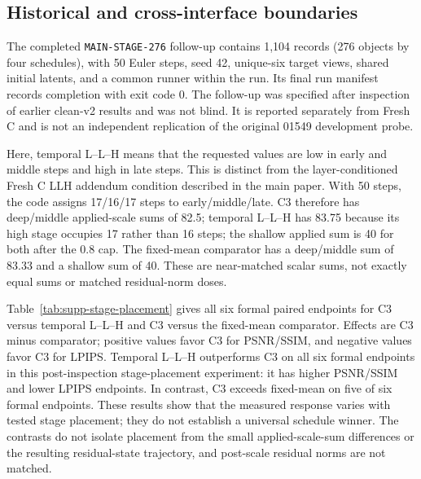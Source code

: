\documentclass[11pt]{article}
\begin{document}
\clearpage

\subsection*{Historical and cross-interface boundaries}
The completed \texttt{MAIN-STAGE-276} follow-up contains 1,104 records (276 objects by four schedules), with 50 Euler steps, seed 42, unique-six target views, shared initial latents, and a common runner within the run. Its final run manifest records completion with exit code 0. The follow-up was specified after inspection of earlier clean-v2 results and was not blind. It is reported separately from Fresh C and is not an independent replication of the original 01549 development probe.

Here, temporal L--L--H means that the requested values are low in early and middle steps and high in late steps. This is distinct from the layer-conditioned Fresh C LLH addendum condition described in the main paper. With 50 steps, the code assigns 17/16/17 steps to early/middle/late. C3 therefore has deep/middle applied-scale sums of 82.5; temporal L--L--H has 83.75 because its high stage occupies 17 rather than 16 steps; the shallow applied sum is 40 for both after the 0.8 cap. The fixed-mean comparator has a deep/middle sum of 83.33 and a shallow sum of 40. These are near-matched scalar sums, not exactly equal sums or matched residual-norm doses.

Table~\ref{tab:supp-stage-placement} gives all six formal paired endpoints for C3 versus temporal L--L--H and C3 versus the fixed-mean comparator. Effects are C3 minus comparator; positive values favor C3 for PSNR/SSIM, and negative values favor C3 for LPIPS. Temporal L--L--H outperforms C3 on all six formal endpoints in this post-inspection stage-placement experiment: it has higher PSNR/SSIM and lower LPIPS endpoints. In contrast, C3 exceeds fixed-mean on five of six formal endpoints. These results show that the measured response varies with tested stage placement; they do not establish a universal schedule winner. The contrasts do not isolate placement from the small applied-scale-sum differences or the resulting residual-state trajectory, and post-scale residual norms are not matched.
\end{document}
